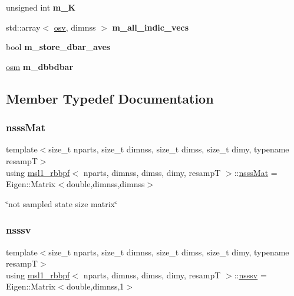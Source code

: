 \begin{DoxyCompactItemize}
\mbox{\label{classmsl1__rbbpf_addbd751848a1ec1db50c74b99fc7e1e6}} 
unsigned int {\bfseries m\+\_\+K}
\item 
\mbox{\label{classmsl1__rbbpf_ab1f11268f20bd920625d274c8cd3cc86}} 
std\+::array$<$ \hyperlink{classmsl1__rbbpf_a23daf10ba0f0b6fead88bc83b4fa27a3}{osv}, dimnss $>$ {\bfseries m\+\_\+all\+\_\+indic\+\_\+vecs}
\item 
\mbox{\label{classmsl1__rbbpf_adae156ecd2755f7dbf227f6b3b31512d}} 
bool {\bfseries m\+\_\+store\+\_\+dbar\+\_\+aves}
\item 
\mbox{\label{classmsl1__rbbpf_a4f758bb182963a08d62ad6a276641a4b}} 
\hyperlink{classmsl1__rbbpf_a1282d71d4d1fc83fd5139ad51c549ecc}{osm} {\bfseries m\+\_\+dbbdbar}
\end{DoxyCompactItemize}


\subsection{Member Typedef Documentation}
\mbox{\label{classmsl1__rbbpf_a8dd96568dc27eddb553e9ff8bf4b3c64}} 
\subsubsection{\texorpdfstring{nsss\+Mat}{nsssMat}}
{\footnotesize\ttfamily template$<$size\+\_\+t nparts, size\+\_\+t dimnss, size\+\_\+t dimss, size\+\_\+t dimy, typename resampT$>$ \\
using \hyperlink{classmsl1__rbbpf}{msl1\+\_\+rbbpf}$<$ nparts, dimnss, dimss, dimy, resampT $>$\+::\hyperlink{classmsl1__rbbpf_a8dd96568dc27eddb553e9ff8bf4b3c64}{nsss\+Mat} =  Eigen\+::\+Matrix$<$double,dimnss,dimnss$>$}

\char`\"{}not sampled state size matrix\char`\"{} \mbox{\label{classmsl1__rbbpf_a7a938d1eb0d1db350b2f2f6804d58999}} 
\subsubsection{\texorpdfstring{nsssv}{nsssv}}
{\footnotesize\ttfamily template$<$size\+\_\+t nparts, size\+\_\+t dimnss, size\+\_\+t dimss, size\+\_\+t dimy, typename resampT$>$ \\
using \hyperlink{classmsl1__rbbpf}{msl1\+\_\+rbbpf}$<$ nparts, dimnss, dimss, dimy, resampT $>$\+::\hyperlink{classmsl1__rbbpf_a7a938d1eb0d1db350b2f2f6804d58999}{nsssv} =  Eigen\+::\+Matrix$<$double,dimnss,1$>$}

